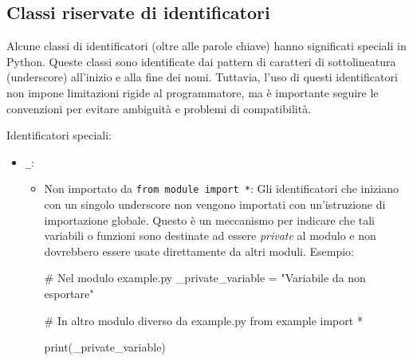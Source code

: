 \documentclass[
  letterpaper,
]{scrbook}
\newenvironment{Shaded}{\begin{snugshade}}{\end{snugshade}}
\newcommand{\BuiltInTok}[1]{\textcolor[rgb]{0.00,0.23,0.31}{#1}}
\newcommand{\CommentTok}[1]{\textcolor[rgb]{0.37,0.37,0.37}{#1}}
\newcommand{\ImportTok}[1]{\textcolor[rgb]{0.00,0.46,0.62}{#1}}
\newcommand{\NormalTok}[1]{\textcolor[rgb]{0.00,0.23,0.31}{#1}}
\newcommand{\OperatorTok}[1]{\textcolor[rgb]{0.37,0.37,0.37}{#1}}
\newcommand{\StringTok}[1]{\textcolor[rgb]{0.13,0.47,0.30}{#1}}
\newcommand*\circled[1]{\tikz[baseline=(char.base)]{
          \node[shape=circle,draw,inner sep=1pt] (char) {{\scriptsize#1}};}}
\begin{document}
\subsection{Classi riservate di
identificatori}\label{classi-riservate-di-identificatori}

Alcune classi di identificatori (oltre alle parole chiave) hanno
significati speciali in Python. Queste classi sono identificate dai
pattern di caratteri di sottolineatura (underscore) all'inizio e alla
fine dei nomi. Tuttavia, l'uso di questi identificatori non impone
limitazioni rigide al programmatore, ma è importante seguire le
convenzioni per evitare ambiguità e problemi di compatibilità.

Identificatori speciali:

\begin{itemize}
\item
  \texttt{\_}:

  \begin{itemize}
  \item
    Non importato da \texttt{from\ module\ import\ *}: Gli
    identificatori che iniziano con un singolo underscore non vengono
    importati con un'istruzione di importazione globale. Questo è un
    meccanismo per indicare che tali variabili o funzioni sono destinate
    ad essere \emph{private} al modulo e non dovrebbero essere usate
    direttamente da altri moduli. Esempio:

\label{annotated-cell-165}%
\begin{Shaded}
\begin{Highlighting}[]
\CommentTok{\# Nel modulo example.py\textasciigrave{}}
\NormalTok{\_private\_variable }\OperatorTok{=} \StringTok{"Variabile da non esportare\textquotesingle{}"} \hspace*{\fill}\NormalTok{\circled{1}}

\CommentTok{\# In altro modulo diverso da example.py}
\ImportTok{from}\NormalTok{ example }\ImportTok{import} \OperatorTok{*}

\BuiltInTok{print}\NormalTok{(\_private\_variable) }\hspace*{\fill}\NormalTok{\circled{2}}
\end{Highlighting}
\end{Shaded}


\end{itemize}
\end{itemize}
\end{document}
